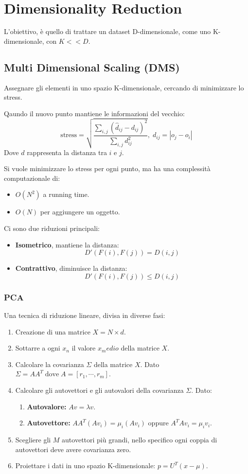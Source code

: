 \chapter{Dimensionality Reduction}
L'obiettivo, è quello di trattare un dataset D-dimensionale, come uno K-dimensionale, con $K << D$.

\section{Multi Dimensional Scaling (DMS)}
Assegnare gli elementi in uno spazio K-dimensionale, cercando di minimizzare lo stress.

\begin{defn}[Stress]
  Qaundo il nuovo punto mantiene le informazioni del vecchio:
  \[
    \text{stress} = \sqrt{\frac{\sum_{i,j} (\hat{d}_{ij} - d_{ij})^2}{\sum_{i,j} d_{ij}^2}}, \; d_{ij} = |o_j - o_i|
  \]
  Dove $d$ rappresenta la distanza tra $i$ e $j$.
\end{defn}
Si vuole minimizzare lo stress per ogni punto, ma ha una complessità computazionale di:
\begin{itemize}
  \item \textbf{$O(N^2)$} a running time.
  \item \textbf{$O(N)$} per aggiungere un oggetto.
\end{itemize}

Ci sono due riduzioni principali:
\begin{itemize}
  \item \textbf{Isometrico}, mantiene la distanza:
    \[
      D'(F(i), F(j)) = D(i,j)
    \]
  \item \textbf{Contrattivo}, diminuisce la distanza:
    \[
      D'(F(i), F(j)) \le D(i,j)
    \]
\end{itemize}

\subsection{PCA}
Una tecnica di riduzione lineare, divisa in diverse fasi:
\begin{enumerate}
  \item Creazione di una matrice $X = N \times d$.
  \item Sottarre a ogni $x_n$ il valore $x_medio$ della matrice $X$.
  \item Calcolare la covarianza $\Sigma$ della matrice $X$. Dato $\Sigma = AA^T \; \text{dove} \; A = [r_1, \cdots, r_m]$.
  \item Calcolare gli autovettori e gli autovalori della covarianza $\Sigma$. Dato:
    \begin{enumerate}
      \item \textbf{Autovalore:} $Av = \lambda v$.
      \item \textbf{Autovettore:} $AA^T(Av_i) = \mu_i(Av_i)$ oppure $A^TAv_i = \mu_iv_i$.
    \end{enumerate}
  \item Scegliere gli $M$ autovettori più grandi, nello specifico ogni coppia di autovettori deve avere covarianza zero.
  \item Proiettare i dati in uno spazio K-dimensionale: $p = U^T(x - \mu)$.
\end{enumerate}

